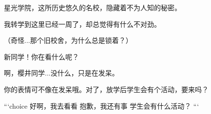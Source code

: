 % 



星光学院，这所历史悠久的名校，隐藏着不为人知的秘密。

我转学到这里已经一周了，却总觉得有什么不对劲。

\flash

\p[thinking] （奇怪...那个旧校舍，为什么总是锁着？）


\s 新同学！你在看什么呢？

\p[surprised] 啊，樱井同学...没什么，只是在发呆。

\s[smile] 你的表情可不像在发呆哦。对了，放学后学生会有个活动，要来吗？

```choice
\case[accept][+s] 好啊，我去看看
\case[decline][-s] 抱歉，我还有事
\case[ask] 学生会有什么活动？
```



%



%
%


